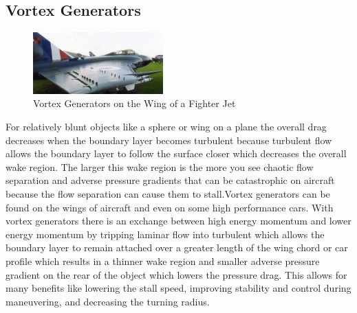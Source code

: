 \documentclass{report}
\begin{document}
\subsection{Vortex Generators}
\begin{figure}[h]
\centering
\includegraphics[width=5cm]{"Vortex Generators"}
\caption{Vortex Generators on the Wing of a Fighter Jet}
\end{figure}
For relatively blunt objects like a sphere or wing on a plane the overall drag decreases when the boundary layer becomes turbulent because turbulent flow allows the boundary layer to follow the surface closer which decreases the overall wake region.  The larger this wake region is the more you see chaotic flow separation and adverse pressure gradients that can be catastrophic on aircraft because the flow separation can cause them to stall.Vortex generators can be found on the wings of aircraft and even on some high performance cars.  With vortex generators there is an exchange between high energy momentum and lower energy momentum by tripping laminar flow into turbulent which allows the boundary layer to remain attached over a greater length of the wing chord or car profile which results in a thinner wake region and smaller adverse pressure gradient on the rear of the object which lowers the pressure drag.  This allows for many benefits like lowering the stall speed, improving stability and control during maneuvering, and decreasing the turning radius.
\end{document}
